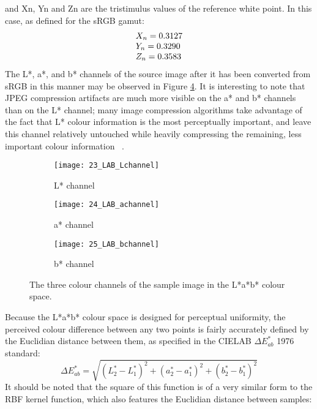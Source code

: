 and Xn, Yn and Zn are the tristimulus values of the reference white point.  In this case, as defined for the sRGB gamut:
\begin{eqnarray}
\begin{array}{l l}
X_{n} = 0.3127\\
Y_{n} = 0.3290\\
Z_{n} = 0.3583
\end{array}
\end{eqnarray}
The L*, a*, and b* channels of the source image after it has been converted from sRGB in this manner may be observed in Figure \ref{fig:labchannels}.  It is interesting to note that JPEG compression artifacts are much more visible on the a* and b* channels than on the L* channel; many image compression algorithms take advantage of the fact that L* colour information is the most perceptually important, and leave this channel relatively untouched while heavily compressing the remaining, less important colour information ~\citep{sayood2005introduction}.

\begin{figure}[h]
        \centering
        \begin{subfigure}[b]{0.33\textwidth}
                \centering
                \texttt{[image: 23\_LAB\_Lchannel]}
                \caption{L* channel}
                \label{fig:23_LAB_Lchannel}
        \end{subfigure}%
        \begin{subfigure}[b]{0.33\textwidth}
                \centering

                \texttt{[image: 24\_LAB\_achannel]}
                \caption{a* channel}
                \label{fig:24_LAB_achannel}     
        \end{subfigure}
        \begin{subfigure}[b]{0.33\textwidth}
                \centering
                \texttt{[image: 25\_LAB\_bchannel]}
                \caption{b* channel}
                \label{fig:25_LAB_bchannel}     
        \end{subfigure}
        \caption{The three colour channels of the sample image in the L*a*b* colour space.}\label{fig:labchannels}
\end{figure}

Because the L*a*b* colour space is designed for perceptual uniformity, the perceived colour difference between any two points is fairly accurately defined by the Euclidian distance between them, as specified in the CIELAB $\Delta E_{ab}^*$ 1976 standard:
\begin{equation}
\Delta E_{ab}^* = \sqrt{ (L^*_2-L^*_1)^2+(a^*_2-a^*_1)^2 + (b^*_2-b^*_1)^2 }
\end{equation}
It should be noted that the square of this function is of a very similar form to the RBF kernel function, which also features the Euclidian distance between samples:

